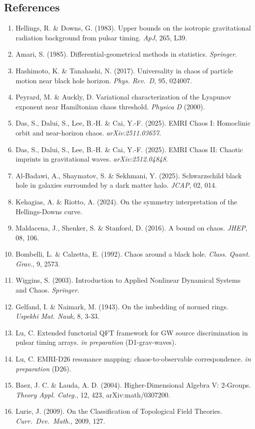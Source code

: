 \documentclass[
]{article}
\providecommand{\tightlist}{%
  \setlength{\itemsep}{0pt}\setlength{\parskip}{0pt}}
\begin{document}
\subsection{References}\label{references}

\begin{enumerate}
\def\labelenumi{\arabic{enumi}.}
\tightlist
\item
  Hellings, R. \& Downs, G. (1983). Upper bounds on the isotropic
  gravitational radiation background from pulsar timing. \emph{ApJ},
  265, L39.
\item
  Amari, S. (1985). Differential-geometrical methods in statistics.
  \emph{Springer}.
\item
  Hashimoto, K. \& Tanahashi, N. (2017). Universality in chaos of
  particle motion near black hole horizon. \emph{Phys. Rev.~D}, 95,
  024007.
\item
  Peyrard, M. \& Auckly, D. Variational characterization of the Lyapunov
  exponent near Hamiltonian chaos threshold. \emph{Physica D} (2000).
\item
  Das, S., Dalui, S., Lee, B.-H. \& Cai, Y.-F. (2025). EMRI Chaos I:
  Homoclinic orbit and near-horizon chaos. \emph{arXiv:2511.03657}.
\item
  Das, S., Dalui, S., Lee, B.-H. \& Cai, Y.-F. (2025). EMRI Chaos II:
  Chaotic imprints in gravitational waves. \emph{arXiv:2512.04848}.
\item
  Al-Badawi, A., Shaymatov, S. \& Sekhmani, Y. (2025). Schwarzschild
  black hole in galaxies surrounded by a dark matter halo. \emph{JCAP},
  02, 014.
\item
  Kehagias, A. \& Riotto, A. (2024). On the symmetry interpretation of
  the Hellings-Downs curve.
\item
  Maldacena, J., Shenker, S. \& Stanford, D. (2016). A bound on chaos.
  \emph{JHEP}, 08, 106.
\item
  Bombelli, L. \& Calzetta, E. (1992). Chaos around a black hole.
  \emph{Class. Quant. Grav.}, 9, 2573.
\item
  Wiggins, S. (2003). Introduction to Applied Nonlinear Dynamical
  Systems and Chaos. \emph{Springer}.
\item
  Gelfand, I. \& Naimark, M. (1943). On the imbedding of normed rings.
  \emph{Uspekhi Mat. Nauk}, 8, 3-33.
\item
  Lu, C. Extended functorial QFT framework for GW source discrimination
  in pulsar timing arrays. \emph{in preparation} (D1-grav-waves).
\item
  Lu, C. EMRI-D26 resonance mapping: chaos-to-observable
  correspondence. \emph{in preparation} (D26).
\item
  Baez, J. C. \& Lauda, A. D. (2004). Higher-Dimensional Algebra V:
  2-Groups. \emph{Theory Appl. Categ.}, 12, 423, arXiv:math/0307200.
\item
  Lurie, J. (2009). On the Classification of Topological Field
  Theories. \emph{Curr.\ Dev.\ Math.}, 2009, 127.
\end{enumerate}
\end{document}

